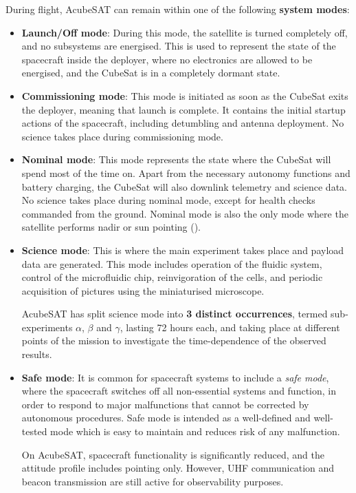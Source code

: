 \documentclass[a4paper,nobib]{tufte-book}
\begin{document}
During flight, AcubeSAT can remain within one of the following \textbf{system modes}:\autocite{MDO}
\begin{itemize}
	\item \textbf{Launch/Off mode}: During this mode, the satellite is turned completely off, and no subsystems are energised. This is used to represent the state of the spacecraft inside the deployer, where no electronics are allowed to be energised,\autocite[req. 3.3.3]{CDS13} and the CubeSat is in a completely dormant state.
	
	\item \textbf{Commissioning mode}: This mode is initiated as soon as the CubeSat exits the deployer, meaning that launch is complete. It contains the initial startup actions of the spacecraft, including detumbling and antenna deployment. No science takes place during commissioning mode.
	
	\item \textbf{Nominal mode}: This mode represents the state where the CubeSat will spend most of the time on. Apart from the necessary autonomy functions and battery charging, the CubeSat will also downlink telemetry and science data. No science takes place during nominal mode, except for health checks commanded from the ground. Nominal mode is also the only mode where the satellite performs nadir or sun pointing ().
	
	\item \textbf{Science mode}: This is where the main experiment takes place and payload data are generated. This mode includes operation of the fluidic system, control of the microfluidic chip, reinvigoration of the cells, and periodic acquisition of pictures using the miniaturised microscope.
	
	AcubeSAT has split science mode into \textbf{3 distinct occurrences}, termed sub-experiments \(\alpha\), \(\beta\) and \(\gamma\), lasting 72 hours each, and taking place at different points of the mission to investigate the time-dependence of the observed results.
	
	\item \textbf{Safe mode}: It is common for spacecraft systems to include a \emph{safe mode},\autocite[385]{aguirre_introduction_space_2013} where the spacecraft switches off all non-essential systems and function, in order to respond to major malfunctions that cannot be corrected by autonomous procedures. Safe mode is intended as a well-defined and well-tested mode which is easy to maintain and reduces risk of any malfunction.
	
	On AcubeSAT, spacecraft functionality is significantly reduced, and the attitude profile includes pointing only. However, \ac{UHF} communication and beacon transmission are still active for observability purposes.
\end{itemize}
\end{document}
